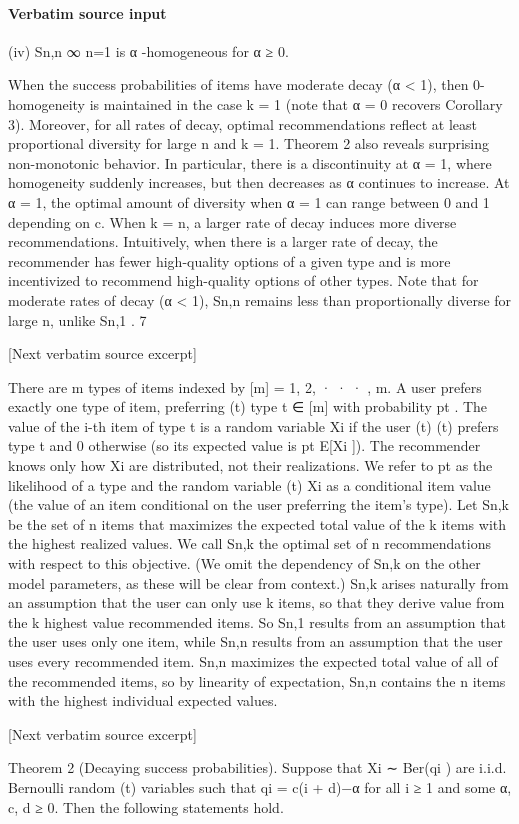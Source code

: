 \documentclass[10pt]{article}
\begin{document}
\paragraph{Verbatim source input}
\begin{ReviewVerbatim}
(iv) {Sn,n }∞
n=1 is α -homogeneous for α ≥ 0.

When the success probabilities of items have moderate decay (α < 1), then 0-homogeneity is maintained in the case k = 1 (note that α = 0 recovers Corollary 3). Moreover, for all rates of decay, optimal
recommendations reflect at least proportional diversity for large n and k = 1.
Theorem 2 also reveals surprising non-monotonic behavior. In particular, there is a discontinuity at
α = 1, where homogeneity suddenly increases, but then decreases as α continues to increase. At α = 1, the
optimal amount of diversity when α = 1 can range between 0 and 1 depending on c.
When k = n, a larger rate of decay induces more diverse recommendations. Intuitively, when there is a
larger rate of decay, the recommender has fewer high-quality options of a given type and is more incentivized
to recommend high-quality options of other types. Note that for moderate rates of decay (α < 1), Sn,n
remains less than proportionally diverse for large n, unlike Sn,1 .
7

[Next verbatim source excerpt]

There are m types of items indexed by [m] = {1, 2, · · · , m}. A user prefers exactly one type of item, preferring
(t)
type t ∈ [m] with probability pt . The value of the i-th item of type t is a random variable Xi if the user
(t)
(t)
prefers type t and 0 otherwise (so its expected value is pt E[Xi ]). The recommender knows only how Xi
are distributed, not their realizations. We refer to pt as the likelihood of a type and the random variable
(t)
Xi as a conditional item value (the value of an item conditional on the user preferring the item’s type).
Let Sn,k be the set of n items that maximizes the expected total value of the k items with the highest
realized values. We call Sn,k the optimal set of n recommendations with respect to this objective. (We omit
the dependency of Sn,k on the other model parameters, as these will be clear from context.)
Sn,k arises naturally from an assumption that the user can only use k items, so that they derive value
from the k highest value recommended items. So Sn,1 results from an assumption that the user uses only
one item, while Sn,n results from an assumption that the user uses every recommended item.
Sn,n maximizes the expected total value of all of the recommended items, so by linearity of expectation,
Sn,n contains the n items with the highest individual expected values.

[Next verbatim source excerpt]

Theorem 2 (Decaying success probabilities). Suppose that Xi ∼ Ber(qi ) are i.i.d. Bernoulli random
(t)
variables such that qi = c(i + d)−α for all i ≥ 1 and some α, c, d ≥ 0. Then the following statements hold.
\end{ReviewVerbatim}
\end{document}
